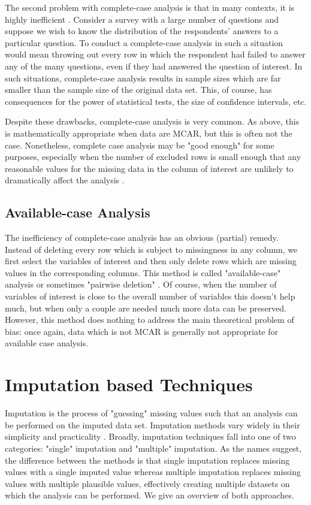 \documentclass[12pt,twoside]{reedthesis}
\theoremstyle{definition}
\begin{document}
The second problem with complete-case analysis is that in many contexts, it is highly inefficient \citep{Little_1986}. Consider a survey with a large number of questions and suppose we wish to know the distribution of the respondents' answers to a particular question. To conduct a complete-case analysis in such a situation would mean throwing out every row in which the respondent had failed to answer any of the many questions, even if they had answered the question of interest. In such situations, complete-case analysis results in sample sizes which are far smaller than the sample size of the original data set. This, of course, has consequences for the power of statistical tests, the size of confidence intervals, etc. 

Despite these drawbacks, complete-case analysis is very common. As above, this is mathematically appropriate when data are MCAR, but this is often not the case. Nonetheless, complete case analysis may be "good enough" for some purposes, especially when the number of excluded rows is small enough that any reasonable values for the missing data in the column of interest are unlikely to dramatically affect the analysis \citep{Schafer_2002}. 

\subsection{Available-case Analysis}

The inefficiency of complete-case analysis has an obvious (partial) remedy. Instead of deleting every row which is subject to missingness in any column, we first select the variables of interest and then only delete rows which are missing values in the corresponding columns. This method is called "available-case" analysis or sometimes "pairwise deletion" \citep{Schafer_2002}. Of course, when the number of variables of interest is close to the overall number of variables this doesn't help much, but when only a couple are needed much more data can be preserved. However, this method does nothing to address the main theoretical problem of bias: once again, data which is not MCAR is generally not appropriate for available case analysis.



\section{Imputation based Techniques} 

Imputation is the process of "guessing" missing values such that an analysis can be performed on the imputed data set. Imputation methods vary widely in their simplicity and practicality \citep{Schafer_2002}. Broadly, imputation techniques fall into one of two categories: "single" imputation and "multiple" imputation. As the names suggest, the difference between the methods is that single imputation replaces missing values with a single imputed value whereas multiple imputation replaces missing values with multiple plausible values, effectively creating multiple datasets on which the analysis can be performed. We give an overview of both approaches.
\end{document}
